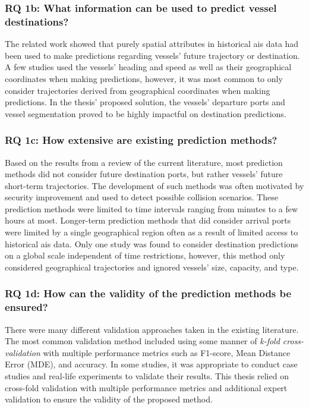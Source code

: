 \subsubsection{RQ 1b: What information can be used to predict vessel destinations?}

The related work showed that purely spatial attributes in historical \acrshort{ais} data had been used to make predictions regarding vessels' future trajectory or destination. A few studies used the vessels' heading and speed as well as their geographical coordinates when making predictions, however, it was most common to only consider trajectories derived from geographical coordinates when making predictions. In the thesis' proposed solution, the vessels' departure ports and vessel segmentation proved to be highly impactful on destination predictions.

\subsubsection{RQ 1c: How extensive are existing prediction methods?}

Based on the results from a review of the current literature, most prediction methods did not consider future destination ports, but rather vessels' future short-term trajectories. The development of such methods was often motivated by security improvement and used to detect possible collision scenarios. These prediction methods were limited to time intervals ranging from minutes to a few hours at most. Longer-term prediction methods that did consider arrival ports were limited by a single geographical region often as a result of limited access to historical \acrshort{ais} data. Only one study was found to consider destination predictions on a global scale independent of time restrictions, however, this method only considered geographical trajectories and ignored vessels' size, capacity, and type.

\subsubsection{RQ 1d: How can the validity of the prediction methods be ensured?}

There were many different validation approaches taken in the existing literature. The most common validation method included using some manner of \textit{k-fold cross-validation} with multiple performance metrics such as F1-score, Mean Distance Error (MDE), and accuracy. In some studies, it was appropriate to conduct case studies and real-life experiments to validate their results. This thesis relied on cross-fold validation with multiple performance metrics and additional expert validation to ensure the validity of the proposed method.

